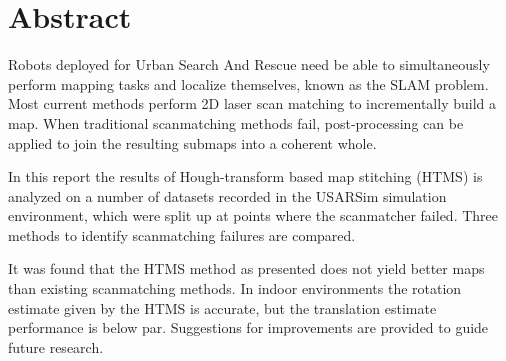\chapter*{Abstract}

Robots deployed for Urban Search And Rescue need be able to simultaneously perform mapping tasks and localize themselves, known as the SLAM problem. Most current methods perform 2D laser scan matching to incrementally build a map. When traditional scanmatching methods fail, post-processing can be applied to join the resulting submaps into a coherent whole. 

In this report the results of Hough-transform based map stitching (HTMS) is analyzed on a number of datasets recorded in the USARSim simulation environment, which were split up at points where the scanmatcher failed. Three methods to identify scanmatching failures are compared.

It was found that the HTMS method as presented does not yield better maps than existing scanmatching methods. In indoor environments the rotation estimate given by the HTMS is accurate, but the translation estimate performance is below par. Suggestions for improvements are provided to guide future research.